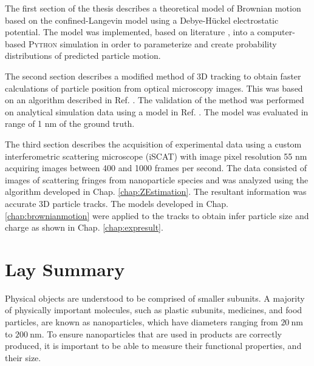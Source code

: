 
The first section of the thesis describes a theoretical model of Brownian motion based on the confined-Langevin model using a Debye-Hückel electrostatic potential. The model was implemented, based on literature \cite{millanNumericalSimulationsConfined2023}, into a computer-based \textsc{Python} simulation in order to parameterize and create probability distributions of predicted particle motion. 

The second section describes a modified method of 3D tracking to obtain faster calculations of particle position from optical microscopy images. This was based on an algorithm described in Ref. \cite{dewitPreciseCharacterizationNanometerscale2023}. The validation of the method was performed on analytical simulation data using a model in Ref. \cite{Dastjerdi2022}. The model was evaluated in range of 1 nm of the ground truth.  

The third section describes the acquisition of  experimental data using a custom interferometric scattering microscope (iSCAT) with image pixel resolution 55 nm acquiring images between 400 and 1000 frames per second. The data consisted of images of scattering fringes from nanoparticle species and was analyzed using the algorithm developed in Chap. \ref{chap:ZEstimation}. The resultant information was accurate 3D particle tracks. The models developed in Chap. \ref{chap:brownianmotion} were applied to the tracks to obtain infer particle size and charge as shown in Chap. \ref{chap:expresult}. 

\newpage
\section*{Lay Summary}

Physical objects are understood to be comprised of smaller subunits. A majority of physically important molecules, such as plastic subunits, medicines, and food particles, are known as nanoparticles, which have diameters ranging from  $\SI{20}{\nm}$ to $\SI{200}{\nm}$. To ensure nanoparticles that are used in products are correctly produced, it is important to be able to measure their functional properties, and their size.

